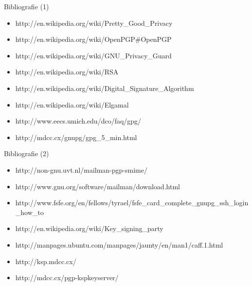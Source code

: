 \documentclass{beamer}
\begin{document}
\begin{frame}{Bibliografie (1)}
  \begin{itemize}
    \item {}
    {http://en.wikipedia.org/wiki/Pretty\_Good\_Privacy}
    \item {} 
    {http://en.wikipedia.org/wiki/OpenPGP\#OpenPGP}
    \item {}
    {http://en.wikipedia.org/wiki/GNU\_Privacy\_Guard}
    \item {}
    {http://en.wikipedia.org/wiki/RSA}
    \item
    {http://en.wikipedia.org/wiki/Digital\_Signature\_Algorithm}
    \item {}
    {http://en.wikipedia.org/wiki/Elgamal}
    \item {}
    {http://www.eecs.umich.edu/dco/faq/gpg/}
    \item {}
    {http://mdcc.cx/gnupg/gpg\_5\_min.html}
  \end{itemize}
\end{frame}

\begin{frame}{Bibliografie (2)}
  \begin{itemize}
    \item {}
    {http://non-gnu.uvt.nl/mailman-pgp-smime/}
    \item
    {http://www.gnu.org/software/mailman/download.html}
    \item
    {http://www.fsfe.org/en/fellows/tyrael/fsfe\_card\_complete\_gnupg\_ssh\_login\_how\_to}
    \item {}
    {http://en.wikipedia.org/wiki/Key\_signing\_party}
    \item
    {http://manpages.ubuntu.com/manpages/jaunty/en/man1/caff.1.html}
    \item {} {http://ksp.mdcc.cx/}
    \item {}
    {http://mdcc.cx/pgp-kspkeyserver/}
  \end{itemize}
\end{frame}
\end{document}
